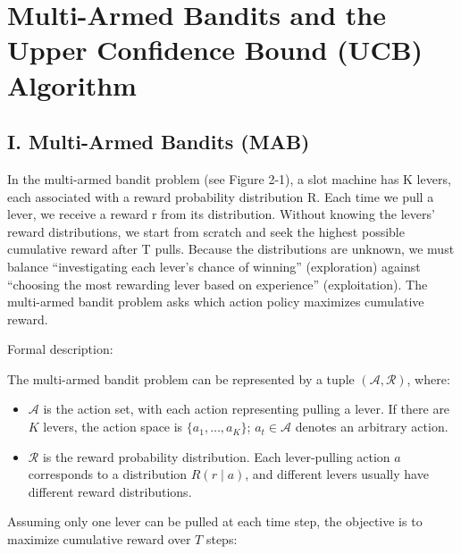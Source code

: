 \setcounter{section}{0}

\hypertarget{multi-armed-bandits-and-the-upper-confidence-bound-ucb-algorithm}{%
\section{Multi-Armed Bandits and the Upper Confidence Bound (UCB) Algorithm}\label{multi-armed-bandits-and-the-upper-confidence-bound-ucb-algorithm}}

\hypertarget{i.-multi-armed-bandits-mab}{%
\subsection{I. Multi-Armed Bandits (MAB)}\label{i.-multi-armed-bandits-mab}}

In the multi-armed bandit problem (see Figure 2-1), a slot machine has K levers, each associated with a reward probability distribution R. Each time we pull a lever, we receive a reward r from its distribution. Without knowing the levers' reward distributions, we start from scratch and seek the highest possible cumulative reward after T pulls. Because the distributions are unknown, we must balance ``investigating each lever's chance of winning'' (exploration) against ``choosing the most rewarding lever based on experience'' (exploitation). The multi-armed bandit problem asks which action policy maximizes cumulative reward.

Formal description:

The multi-armed bandit problem can be represented by a tuple \((\mathcal{A}, \mathcal{R})\), where:

\begin{itemize}
\tightlist
\item
  \(\mathcal{A}\) is the action set, with each action representing pulling a lever. If there are \(K\) levers, the action space is \(\{a_1,\ldots,a_K\}\); \(a_t \in \mathcal{A}\) denotes an arbitrary action.
\item
  \(\mathcal{R}\) is the reward probability distribution. Each lever-pulling action \(a\) corresponds to a distribution \(R(r\mid a)\), and different levers usually have different reward distributions.
\end{itemize}

Assuming only one lever can be pulled at each time step, the objective is to maximize cumulative reward over \(T\) steps:

